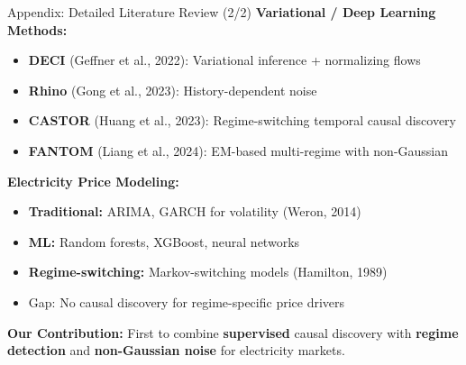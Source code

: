 \documentclass[aspectratio=169]{beamer}
\begin{document}
\begin{frame}{Appendix: Detailed Literature Review (2/2)}
\textbf{Variational / Deep Learning Methods:}
\begin{itemize}
    \item \textbf{DECI} (Geffner et al., 2022): Variational inference + normalizing flows
    \item \textbf{Rhino} (Gong et al., 2023): History-dependent noise
    \item \textbf{CASTOR} (Huang et al., 2023): Regime-switching temporal causal discovery
    \item \textbf{FANTOM} (Liang et al., 2024): EM-based multi-regime with non-Gaussian
\end{itemize}

\vspace{0.3cm}
\textbf{Electricity Price Modeling:}
\begin{itemize}
    \item \textbf{Traditional:} ARIMA, GARCH for volatility (Weron, 2014)
    \item \textbf{ML:} Random forests, XGBoost, neural networks
    \item \textbf{Regime-switching:} Markov-switching models (Hamilton, 1989)
    \item \textcolor{warnred}{Gap:} No causal discovery for regime-specific price drivers
\end{itemize}

\vspace{0.3cm}
\textbf{Our Contribution:} First to combine \textbf{supervised} causal discovery with \textbf{regime detection} and \textbf{non-Gaussian noise} for electricity markets.
\end{frame}
\end{document}
